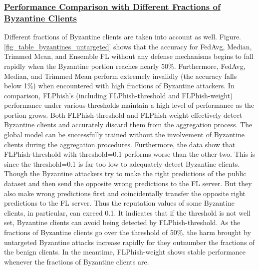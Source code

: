 \documentclass[journal]{IEEEtran}
\begin{document}
    \subsubsection{\ul{Performance Comparison with Different Fractions of Byzantine Clients}} Different fractions of Byzantine clients are taken into account as well. Figure. \ref{fig_table_byzantines_untargeted} shows that the accuracy for FedAvg, Median, Trimmed Mean, and Ensemble FL without any defense mechanisms begins to fall rapidly when the Byzantine portion reaches nearly 50\%. Furthermore, FedAvg, Median, and Trimmed Mean perform extremely invalidly (the accuracy falls below 1\%) when encountered with high fractions of Byzantine attackers. In comparison, FLPhish's (including FLPhish-threshold and FLPhish-weight) performance under various thresholds maintain a high level of performance as the portion grows. Both FLPhish-threshold and FLPhish-weight effectively detect Byzantine clients and accurately discard them from the aggregation process. The global model can be successfully trained without the involvement of Byzantine clients during the aggregation procedures. Furthermore, the data show that FLPhish-threshold with threshold=0.1 performs worse than the other two. This is since the threshold=0.1 is far too low to adequately detect Byzantine clients. Though the Byzantine attackers try to make the right predictions of the public dataset and then send the opposite wrong predictions to the FL server. But they also make wrong predictions first and coincidentally transfer the opposite right predictions to the FL server. Thus the reputation values of some Byzantine clients, in particular, can exceed 0.1. It indicates that if the threshold is not well set, Byzantine clients can avoid being detected by FLPhish-threshold. As the fractions of Byzantine clients go over the threshold of 50\%, the harm brought by untargeted Byzantine attacks increase rapidly for they outnumber the fractions of the benign clients. In the meantime, FLPhish-weight shows stable performance whenever the fractions of Byzantine clients are.
\end{document}
